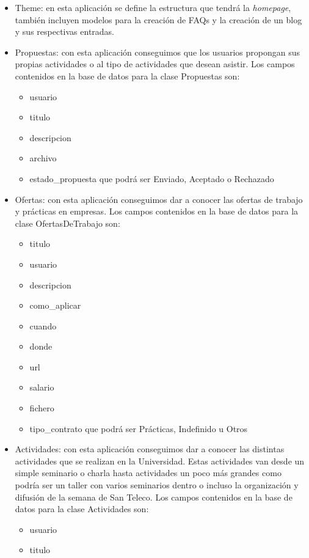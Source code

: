 \begin{itemize}
\item Theme: en esta aplicación se define la estructura que tendrá la \textit{homepage}, también incluyen modelos para la creación de FAQs y la creación de un blog y sus respectivas entradas.

\item Propuestas: con esta aplicación conseguimos que los usuarios propongan sus propias actividades o al tipo de actividades que desean asistir.
Los campos contenidos en la base de datos para la clase Propuestas son:
	\begin{itemize}
		\item usuario
		\item titulo
		\item descripcion
		\item archivo
		\item estado\_propuesta que podrá ser Enviado, Aceptado o Rechazado
	\end{itemize}
\item Ofertas: con esta aplicación conseguimos dar a conocer las ofertas de trabajo y prácticas en empresas.
Los campos contenidos en la base de datos para la clase OfertasDeTrabajo son:
	\begin{itemize}
		\item titulo
		\item usuario
		\item descripcion
		\item como\_aplicar
		\item cuando
		\item donde
		\item url
		\item salario
		\item fichero
		\item tipo\_contrato que podrá ser Prácticas, Indefinido u Otros
	\end{itemize}
\item Actividades: con esta aplicación conseguimos dar a conocer las distintas actividades que se realizan en la Universidad. Estas actividades van desde un simple seminario o charla hasta actividades un poco más grandes como podría ser un taller con varios seminarios dentro o incluso la organización y difusión de la semana de San Teleco.
Los campos contenidos en la base de datos para la clase Actividades son:
	\begin{itemize}
		\item usuario
		\item titulo

\end{itemize}
\end{itemize}
